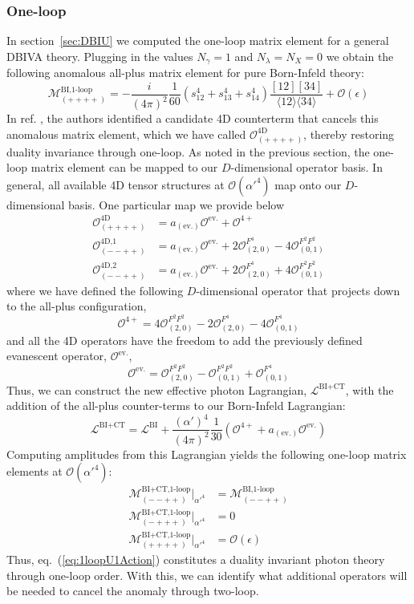 \documentclass[12pt,letter]{article}
\def\sect#1{section~\ref{#1}}
\def\eqn#1{eq.~(\ref{#1})}
\def\be{\begin{equation}}
\def\ee{\end{equation}}
\begin{document}
\subsubsection{One-loop}\label{sec:Anomalies1loop}
In \sect{sec:DBIU} we computed the one-loop matrix element for a general DBIVA theory. Plugging in the values $N_{\gamma}=1$ and $N_\lambda = N_X = 0$ we obtain the following anomalous all-plus matrix element for pure Born-Infeld theory:
\be
\mathcal{M}^{\text{BI,1-loop}}_{(++++)} = -\frac{i}{(4\pi)^2}\frac{1}{60}(s_{12}^4+s_{13}^4+s_{14}^4)\frac{[12][34]}{\langle12\rangle\langle 34\rangle}+\mathcal{O}(\epsilon)
\ee
In ref. \cite{Elvang:2020kuj}, the authors identified a candidate 4D counterterm that cancels this anomalous matrix element, which we have called $\mathcal{O}^{\text{4D}}_{(++++)}$, thereby restoring duality invariance through one-loop. As noted in the previous section, the one-loop matrix element can be mapped to our $D$-dimensional operator basis. In general, all available 4D tensor structures at $\mathcal{O}(\alpha'^4)$ map onto our $D$-dimensional basis. One particular map we provide below
\begin{align}
\mathcal{O}^{\text{4D}}_{(++++)} &=  a_{({\text{ev.}})}\mathcal{O}^{\text{ev.}}+\mathcal{O}^{4+}
\\ 
\mathcal{O}^{\text{4D,1}}_{(--++)} &= a_{({\text{ev.}})}\mathcal{O}^{\text{ev.}}+2\mathcal{O}_{(2,0)}^{F^4}- 4\mathcal{O}_{(0,1)}^{F^2F^2}
\\ 
\mathcal{O}^{4\text{D,}2}_{(--++)} &= a_{({\text{ev.}})}\mathcal{O}^{\text{ev.}}+2\mathcal{O}_{(2,0)}^{F^4}+ 4\mathcal{O}_{(0,1)}^{F^2F^2}
\end{align}
where we have defined the following $D$-dimensional operator that projects down to the all-plus configuration,
\be
\mathcal{O}^{4+}= 4 \mathcal{O}_{(2,0)}^{F^2F^2}-2\mathcal{O}_{(2,0)}^{F^4}-4\mathcal{O}_{(0,1)}^{F^4}
\ee
and all the 4D operators have the freedom to add the previously defined evanescent operator, $\mathcal{O}^{\text{ev.}}$, 
\be
\mathcal{O}^{\text{ev.}} = \mathcal{O}_{(2,0)}^{F^2F^2}-\mathcal{O}_{(0,1)}^{F^2F^2} + \mathcal{O}_{(0,1)}^{F^4}
\ee
Thus, we can construct the new effective photon Lagrangian, $\mathcal{L}^{\text{BI}+\text{CT}}$, with the addition of the all-plus counter-terms to our Born-Infeld Lagrangian:
\be \label{eq:1loopU1Action}
\mathcal{L}^{\text{BI}+\text{CT}} = \mathcal{L}^{\text{BI}} + \frac{(\alpha')^4}{(4\pi)^2}\frac{1}{30}\left(\mathcal{O}^{4+}+ a_{({\text{ev.}})}\mathcal{O}^{\text{ev.}}\right)
\ee
Computing amplitudes from this Lagrangian yields the following one-loop matrix elements at $\mathcal{O}(\alpha'^4)$:
\begin{align}
\mathcal{M}^{\text{BI+CT,1-loop}}_{(--++)}\big|_{\alpha'^4} &= \mathcal{M}^{\text{BI,1-loop}}_{(--++)}  
\\
 \mathcal{M}^{\text{BI+CT,1-loop}}_{(-+++)}\big|_{\alpha'^4} &= 0
 \\
 \mathcal{M}^{\text{BI+CT,1-loop}}_{(++++)}\big|_{\alpha'^4}  &= \mathcal{O}(\epsilon)
\end{align}
Thus, \eqn{eq:1loopU1Action} constitutes a duality invariant photon theory through one-loop order. With this, we can identify what additional operators will be needed to cancel the anomaly through two-loop. 
\end{document}
